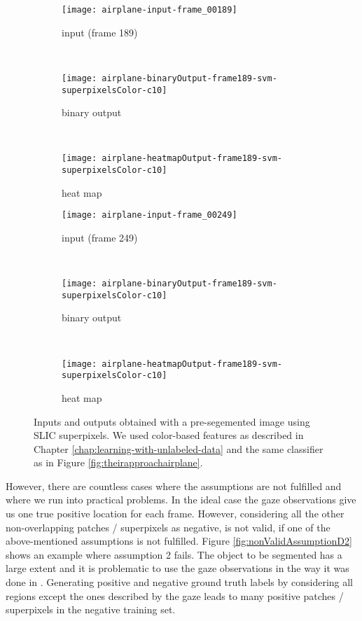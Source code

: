 \begin{figure}[ht]
	\centering
	\begin{subfigure}[h]{0.31\textwidth}
		\texttt{[image: airplane-input-frame\_00189]}
		\caption*{input (frame 189)}
	\end{subfigure}
	~
	\begin{subfigure}[h]{0.31\textwidth}
		\texttt{[image: airplane-binaryOutput-frame189-svm-superpixelsColor-c10]}	
		\caption*{binary output}
	\end{subfigure}
	~
	\begin{subfigure}[h]{0.31\textwidth}
		\texttt{[image: airplane-heatmapOutput-frame189-svm-superpixelsColor-c10]}	
		\caption*{heat map}
	\end{subfigure}
	
	\vspace{3mm}
	\begin{subfigure}[h]{0.31\textwidth}
		\texttt{[image: airplane-input-frame\_00249]}	
		\caption*{input (frame 249)}
	\end{subfigure}
	~
	\begin{subfigure}[h]{0.31\textwidth}
		\texttt{[image: airplane-binaryOutput-frame189-svm-superpixelsColor-c10]}	
		\caption*{binary output}
	\end{subfigure}	
	~
	\begin{subfigure}[h]{0.31\textwidth}
		\texttt{[image: airplane-heatmapOutput-frame189-svm-superpixelsColor-c10]}	
		\caption*{heat map}
	\end{subfigure}	
	\caption{Inputs and outputs obtained with a pre-segemented image using SLIC superpixels. We used color-based features as described in Chapter \ref{chap:learning-with-unlabeled-data} and the same classifier as in Figure \ref{fig:theirapproachairplane}.}
	\label{fig:airplaneSLIC}
\end{figure}

However, there are countless cases where the assumptions are not fulfilled and where we run into practical problems. 
In the ideal case the gaze observations give us one true positive location for each frame. 
However, considering all the other non-overlapping patches / superpixels as negative, is not valid, if one of the above-mentioned assumptions is not fulfilled.
Figure \ref{fig:nonValidAssumptionD2} shows an example where assumption 2 fails. The object to be segmented has a large extent and it is problematic to use the gaze observations in the way it was done in \cite{vilarino2007automatic}. Generating positive and negative ground truth labels by considering all regions except the ones described by the gaze leads to many positive patches / superpixels in the negative training set.

